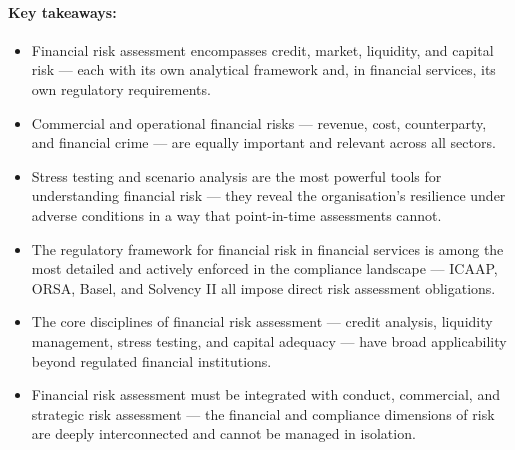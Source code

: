 \paragraph{Key takeaways:}
\begin{itemize}
  \item{Financial risk assessment encompasses credit, market, liquidity, and capital risk — each with its own analytical framework and, in financial services, its own regulatory requirements.}
  \item{Commercial and operational financial risks — revenue, cost, counterparty, and financial crime — are equally important and relevant across all sectors.}
  \item{Stress testing and scenario analysis are the most powerful tools for understanding financial risk — they reveal the organisation's resilience under adverse conditions in a way that point-in-time assessments cannot.}
  \item{The regulatory framework for financial risk in financial services is among the most detailed and actively enforced in the compliance landscape — ICAAP, ORSA, Basel, and Solvency II all impose direct risk assessment obligations.}
  \item{The core disciplines of financial risk assessment — credit analysis, liquidity management, stress testing, and capital adequacy — have broad applicability beyond regulated financial institutions.}
  \item{Financial risk assessment must be integrated with conduct, commercial, and strategic risk assessment — the financial and compliance dimensions of risk are deeply interconnected and cannot be managed in isolation.}
\end{itemize}

